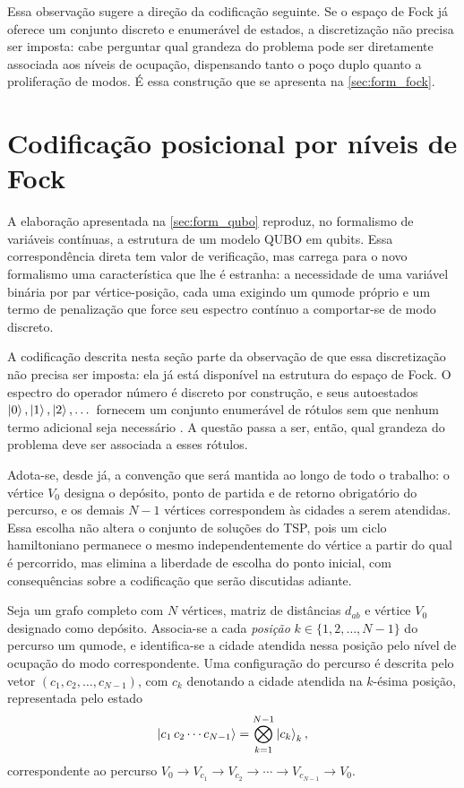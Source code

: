         Essa observação sugere a direção da codificação seguinte. Se o espaço de Fock já oferece um conjunto discreto e enumerável de estados, a discretização não precisa ser imposta: cabe perguntar qual grandeza do problema pode ser diretamente associada aos níveis de ocupação, dispensando tanto o poço duplo quanto a proliferação de modos. É essa construção que se apresenta na \autoref{sec:form_fock}.


\section{Codificação posicional por níveis de Fock}\label{sec:form_fock}

    A elaboração apresentada na \autoref{sec:form_qubo} reproduz, no formalismo de variáveis contínuas, a estrutura de um modelo QUBO em qubits. Essa correspondência direta tem valor de verificação, mas carrega para o novo formalismo uma característica que lhe é estranha: a necessidade de uma variável binária por par vértice-posição, cada uma exigindo um qumode próprio e um termo de penalização que force seu espectro contínuo a comportar-se de modo discreto.

    A codificação descrita nesta seção parte da observação de que essa discretização não precisa ser imposta: ela já está disponível na estrutura do espaço de Fock. O espectro do operador número é discreto por construção, e seus autoestados $\ket{0}, \ket{1}, \ket{2}, \dots$ fornecem um conjunto enumerável de rótulos sem que nenhum termo adicional seja necessário \cite{weedbrook2012gaussian}. A questão passa a ser, então, qual grandeza do problema deve ser associada a esses rótulos.

    Adota-se, desde já, a convenção que será mantida ao longo de todo o trabalho: o vértice $V_0$ designa o depósito, ponto de partida e de retorno obrigatório do percurso, e os demais $N-1$ vértices correspondem às cidades a serem atendidas. Essa escolha não altera o conjunto de soluções do TSP, pois um ciclo hamiltoniano permanece o mesmo independentemente do vértice a partir do qual é percorrido, mas elimina a liberdade de escolha do ponto inicial, com consequências sobre a codificação que serão discutidas adiante.

    \begin{defi}\label{defi:cod_posicional}
        Seja um grafo completo com $N$ vértices, matriz de distâncias $d_{ab}$ e vértice $V_0$ designado como depósito. Associa-se a cada \emph{posição} $k \in \{1, 2, \dots, N-1\}$ do percurso um qumode, e identifica-se a cidade atendida nessa posição pelo nível de ocupação do modo correspondente. Uma configuração do percurso é descrita pelo vetor $(c_1, c_2, \dots, c_{N-1})$, com $c_k$ denotando a cidade atendida na $k$-ésima posição, representada pelo estado
        \begin{equation}\label{eq:estado_cod_posicional}
            \ket{c_1\, c_2 \cdots c_{N-1}} = \bigotimes_{k=1}^{N-1} \ket{c_k}_k ,
        \end{equation}
        \noindent correspondente ao percurso $V_0 \rightarrow V_{c_1} \rightarrow V_{c_2} \rightarrow \cdots \rightarrow V_{c_{N-1}} \rightarrow V_0$.
    \end{defi}

